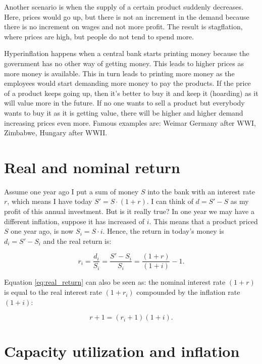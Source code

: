 Another scenario is when the supply of a certain product suddenly decreases. Here, prices would go up, but there is not an increment in the demand because there is no increment on wages and not more profit. The result is stagflation, where prices are high, but people do not tend to spend more.

Hyperinflation happens when a central bank starts printing money because the government has no other way of getting money. This leads to higher prices as more money is available. This in turn leads to printing more money as the employees would start demanding more money to pay the products. If the price of a product keeps going up, then it's better to buy it and keep it (hoarding) as it will value more in the future. If no one wants to sell a product but everybody wants to buy it as it is getting value, there will be higher and higher demand increasing prices even more. Famous examples are: Weimar Germany after WWI, Zimbabwe, Hungary after WWII.

\section{Real and nominal return}

Assume one year ago I put a sum of money $S$ into the bank with an interest rate $r$, which means I have today $S' = S\cdot (1+r)$. I can think of $d = S'-S$ as my profit of this annual investment. But is it really true? In one year we may have a different inflation, suppose it has increased of $i$. This means that a product priced $S$ one year ago, is now $S_i = S \cdot i$. Hence, the return in today's money is $d_i = S' - S_i$ and the real return is:

\begin{equation}\label{eq:real_return}
r_i = \dfrac{d_i}{S_i} = \dfrac{S' - S_i}{S_i} = \dfrac{(1+r)}{(1+i)}-1.
\end{equation}

Equation \ref{eq:real_return} can also be seen as: the nominal interest rate $(1+r)$ is equal to the real interest rate $(1+r_i)$ compounded by the inflation rate $(1+i):$

\begin{equation}\label{eq:nominal_rate}
r+1 = (r_i + 1)(1+i).
\end{equation}


\section{Capacity utilization and inflation}

